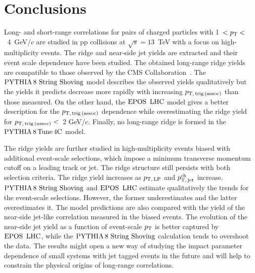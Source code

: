 
\section{Conclusions}
\label{sec:summary}

Long- and short-range correlations for pairs of charged particles with 1~$ < p_\mathrm{T} < $~4~GeV/$c$ are studied in pp collisions at $\sqrt{s} = 13$~TeV with a focus on high-multiplicity events. The ridge and near-side jet yields are extracted and their event scale dependence have been studied. The obtained long-range ridge yields are compatible to those observed by the CMS Collaboration~\cite{Khachatryan:2015lva}.
The ${\mathrm{PYTHIA}\,8~\mathrm{String}~}\mathrm{Shoving}$ model describes the observed yields qualitatively but the yields it predicts decrease more rapidly with increasing $p_\mathrm{T,\,trig\,(assoc)}$ than those measured. On the other hand, the ${\mathrm{EPOS}\,~\mathrm{LHC}}$ model gives a better description for the $p_\mathrm{T,\,trig\,(assoc)}$ dependence while overestimating the ridge yield for $p_\mathrm{T,\,trig\,(assoc)}<$~2 GeV/$c$. Finally, no long-range ridge is formed in the $\mathrm{PYTHIA}\,8\,\mathrm{Tune\,4C}$ model.

The ridge yields are further studied in high-multiplicity events biased with additional event-scale selections, which impose a minimum transverse momentum cutoff on a leading track or jet. The ridge structure still persists with both selection criteria. The ridge yield increases as $p_\mathrm{T,\,LP}$ and $p_\mathrm{T,\,jet}^\mathrm{ch}$ increase. ${\mathrm{PYTHIA}\,8~\mathrm{String}~}\mathrm{Shoving}$ and ${\mathrm{EPOS}\,~\mathrm{LHC}}$ estimate qualitatively the trends for the event-scale selections. However, the former underestimates and the latter overestimates it. The model predictions are also compared with the yield of the near-side jet-like correlation measured in the biased events. The evolution of the near-side jet yield as a function of event-scale $p_\mathrm{T}$ is better captured by ${\mathrm{EPOS}\,~\mathrm{LHC}}$, while the ${\mathrm{PYTHIA}\,8~\mathrm{String}~}\mathrm{Shoving}$ calculation tends to overshoot the data. 
The results might open a new way of studying the impact parameter dependence of small systems with jet tagged events in the future and will help to constrain the physical origins of long-range correlations.
